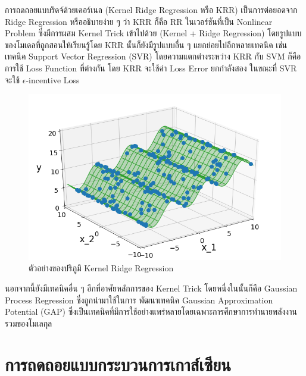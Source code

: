 การถดถอยแบบริดจ์ด้วยเคอร์เนล (Kernel Ridge Regression หรือ KRR) เป็นการต่อยอดจาก Ridge Regression หรืออธิบายง่าย ๆ ว่า
KRR ก็คือ RR ในเวอร์ชันที่เป็น Nonlinear Problem ซึ่งมีการผสม Kernel Trick เข้าไปด้วย (Kernel + Ridge Regression)
โดยรูปแบบของโมเดลที่ถูกสอนให้เรียนรู้โดย KRR นั้นก็ยังมีรูปแบบอื่น ๆ แยกย่อยไปอีกหลายเทคนิค เช่น เทคนิค Support Vector Regression
(SVR) โดยความแตกต่างระหว่าง KRR กับ SVM ก็คือการใช้ Loss Function ที่ต่างกัน โดย KRR จะใช้ค่า Loss Error ยกกำลังสอง ในขณะที่
SVR จะใช้ $\epsilon$-incentive Loss

\begin{figure}[H]
    \centering
    \includegraphics[width=0.9\linewidth]{fig/krr_space.png}
    \caption{ตัวอย่างของปริภูมิ Kernel Ridge Regression}
    \label{fig:krr_space}
\end{figure}

นอกจากนี้ยังมีเทคนิคอื่น ๆ อีกที่อาศัยหลักการของ Kernel Trick โดยหนึ่งในนั้นก็คือ Gaussian Process Regression ซึ่งถูกนำมาใช้ในการ%
พัฒนาเทคนิค Gaussian Approximation Potential (GAP) ซึ่งเป็นเทคนิคที่มีการใช้อย่างแพร่หลายโดยเฉพาะการศึกษาการทำนายพลังงาน%
รวมของโมเลกุล\autocite{bartok2010,bartok2015}

\section{การถดถอยแบบกระบวนการเกาส์เซียน}
\label{sec:gaussian_process}

